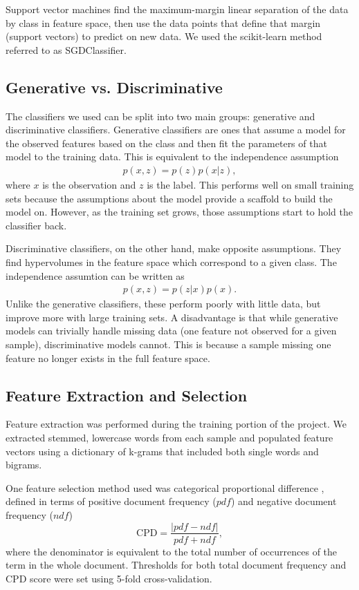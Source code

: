 \documentclass{article} %
\begin{document}
	Support vector machines find the maximum-margin linear separation of the data by class in feature space, then use the data points that define that margin (support vectors) to predict on new data. We used the scikit-learn method referred to as SGDClassifier.
		
	\subsection{Generative vs. Discriminative}
	
	The classifiers we used can be split into two main groups: generative and discriminative classifiers. Generative classifiers are ones that assume a model for the observed features based on the class and then fit the parameters of that model to the training data. This is equivalent to the independence assumption
	\begin{align}
	p(x,z) = p(z)p(x|z),
	\end{align}
	where $x$ is the observation and $z$ is the label. This performs well on small training sets because the assumptions about the model provide a scaffold to build the model on. However, as the training set grows, those assumptions start to hold the classifier back.
	
	Discriminative classifiers, on the other hand, make opposite assumptions. They find hypervolumes in the feature space which correspond to a given class. The independence assumtion can be written as 
	\begin{align}
	p(x,z) = p(z|x)p(x).
	\end{align}
	Unlike the generative classifiers, these perform poorly with little data, but improve more with large training sets. A disadvantage is that while generative models can trivially handle missing data (one feature not observed for a given sample), discriminative models cannot. This is because a sample missing one feature no longer exists in the full feature space.
	
	\subsection{Feature Extraction and Selection}
	
	Feature extraction was performed during the training portion of the project. We extracted stemmed, lowercase words from each sample and populated feature vectors using a dictionary of k-grams that included both single words and bigrams. 
	
	One feature selection method used was categorical proportional difference \cite{oKeefe2009}, defined in terms of positive document frequency ($pdf$) and negative document frequency ($ndf$)
	\begin{equation}
	\mbox{CPD} = \frac{|pdf - ndf|}{pdf + ndf},
	\end{equation}
	where the denominator is equivalent to the total number of occurrences of the term in the whole document. Thresholds for both total document frequency and CPD score were set using 5-fold cross-validation.
	
\end{document}
